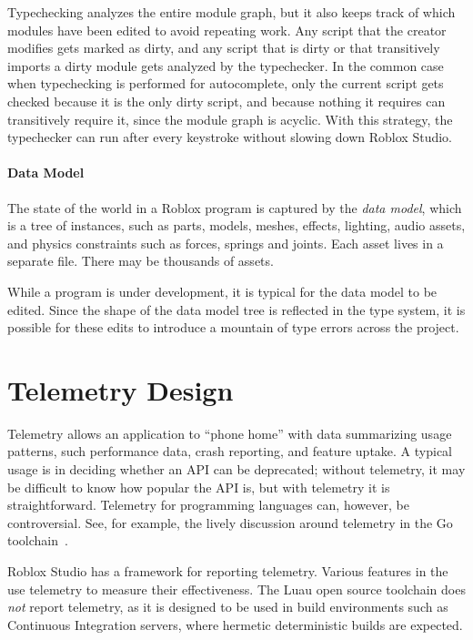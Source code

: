 \documentclass[english,submission,cleveref]{programming}
\begin{document}
Typechecking analyzes the entire module graph, but it also keeps track of which
modules have been edited to avoid repeating work.
Any script that the creator modifies gets marked as dirty,
and any script that is dirty or that transitively imports a dirty
module gets analyzed by the typechecker.
In the common case when typechecking is performed for autocomplete,
only the current script gets checked because it is the only dirty
script, and because nothing it requires can transitively require it, since
the module graph is acyclic.
With this strategy, the typechecker can run after every keystroke without
slowing down Roblox Studio.


\paragraph{Data Model}

The state of the world in a {Roblox} program is captured by
the \emph{data model}, which is a tree of {instances}, such as
parts, models, meshes, effects, lighting, audio assets, and physics
constraints such as forces, springs and joints.
Each asset lives in a separate file.
There may be thousands of assets.

While a program is under development, it is typical for the data
model to be edited.
Since the shape of the data model tree is reflected in
the type system, it is possible for these edits to introduce a mountain
of type errors across the project.


\section{Telemetry Design}

Telemetry allows an application to ``phone home'' with data
summarizing usage patterns, such performance data, crash reporting,
and feature uptake. A typical usage is in deciding whether an API can
be deprecated; without telemetry, it may be difficult to know how
popular the API is, but with telemetry it is straightforward.
Telemetry for programming languages can, however, be controversial.
See, for example, the lively discussion around telemetry in the Go
toolchain~\cite{golang-telemetry}.

Roblox Studio has a framework for reporting telemetry.
Various features in the \IDE{} use telemetry to measure their effectiveness.
The Luau open source toolchain does \emph{not} report telemetry,
as it is designed to be used in build environments such as Continuous Integration
servers, where hermetic deterministic builds are expected.
\end{document}
